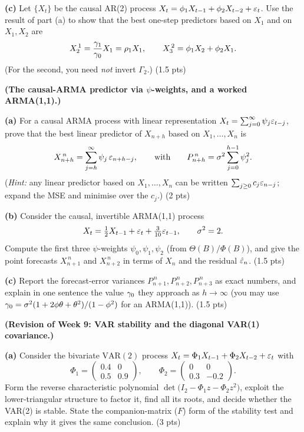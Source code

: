 \documentclass[11pt]{article}
\begin{document}
\textbf{(c)} Let $\{X_t\}$ be the causal AR(2) process $X_t=\phi_1 X_{t-1}+\phi_2 X_{t-2}+\varepsilon_t$. Use the result of part (a) to show that the best one-step predictors based on $X_1$ and on $X_1,X_2$ are
\[
X^{\,1}_2=\frac{\gamma_1}{\gamma_0}X_1=\rho_1 X_1,
\qquad
X^{\,2}_3=\phi_1 X_2+\phi_2 X_1 .
\]
(For the second, you need \emph{not} invert $\Gamma_2$.) \hfill(1.5 pts)
\answerpage

\textbf{(The causal-ARMA predictor via $\psi$-weights, and a worked ARMA(1,1).)}

\textbf{(a)} For a causal ARMA process with linear representation $X_t=\sum_{j=0}^\infty\psi_j\varepsilon_{t-j}$, prove that the best linear predictor of $X_{n+h}$ based on $X_1,\dots,X_n$ is
\[
X^{\,n}_{n+h}=\sum_{j=h}^{\infty}\psi_j\,\varepsilon_{n+h-j},
\qquad\text{with}\qquad
P^{\,n}_{n+h}=\sigma^2\sum_{j=0}^{h-1}\psi_j^2 .
\]
(\emph{Hint:} any linear predictor based on $X_1,\dots,X_n$ can be written $\sum_{j\ge0}c_j\varepsilon_{n-j}$; expand the MSE and minimise over the $c_j$.) \hfill(2 pts)

\textbf{(b)} Consider the causal, invertible ARMA(1,1) process
\[
X_t=\tfrac12 X_{t-1}+\varepsilon_t+\tfrac{3}{10}\varepsilon_{t-1},\qquad \sigma^2=2 .
\]
Compute the first three $\psi$-weights $\psi_0,\psi_1,\psi_2$ (from $\Theta(B)/\Phi(B)$), and give the point forecasts $X^{\,n}_{n+1}$ and $X^{\,n}_{n+2}$ in terms of $X_n$ and the residual $\hat{\varepsilon}_n$. \hfill(1.5 pts)

\textbf{(c)} Report the forecast-error variances $P^{\,n}_{n+1},P^{\,n}_{n+2},P^{\,n}_{n+3}$ as exact numbers, and explain in one sentence the value $\gamma_0$ they approach as $h\to\infty$ (you may use $\gamma_0=\sigma^2(1+2\phi\theta+\theta^2)/(1-\phi^2)$ for an ARMA(1,1)). \hfill(1.5 pts)
\answerpage

\textbf{(Revision of Week 9: VAR stability and the diagonal VAR(1) covariance.)}

\textbf{(a)} Consider the bivariate $\mathrm{VAR}(2)$ process $X_t=\Phi_1X_{t-1}+\Phi_2X_{t-2}+\varepsilon_t$ with
\[
\Phi_1=\begin{pmatrix}0.4 & 0\\[2pt] 0.5 & 0.9\end{pmatrix},\qquad
\Phi_2=\begin{pmatrix}0 & 0\\[2pt] 0.3 & -0.2\end{pmatrix}.
\]
Form the reverse characteristic polynomial $\det\bigl(I_2-\Phi_1 z-\Phi_2 z^2\bigr)$, exploit the lower-triangular structure to factor it, find all its roots, and decide whether the VAR(2) is stable. State the companion-matrix ($F$) form of the stability test and explain why it gives the same conclusion. \hfill(3 pts)
\end{document}

